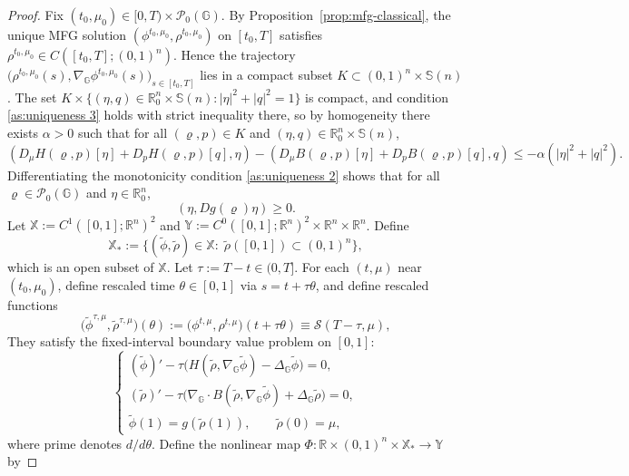 \documentclass[10pt]{article}
\numberwithin{equation}{section}
\newcommand{\cP}{ \mathcal{P}}
\newcommand{\cS}{ \mathcal{S}}
\newcommand{\bR}{\mathbb R}
\newcommand{\R}{\mathbb R}
\newcommand{\bS}{\mathbb S}
\def\R{{\mathbb{R}}}
\def\G{\mathbb{G}}
\begin{document}
\begin{proof}
Fix $(t_0,\mu_0) \in [0,T) \times \cP_0(\G)$. By Proposition~\ref{prop:mfg-classical}, the unique MFG solution $(\phi^{t_0,\mu_0}, \rho^{t_0,\mu_0})$ on $[t_0,T]$ satisfies $\rho^{t_0,\mu_0} \in C([t_0,T]; (0,1)^n)$. Hence the trajectory $\big(\rho^{t_0,\mu_0}(s), \nabla_\G \phi^{t_0,\mu_0}(s)\big)_{s \in [t_0,T]}$ lies in a compact subset $K \subset (0,1)^n \times \bS(n)$. The set $K \times \{(\eta, q) \in \bR^n_0 \times \bS(n) : |\eta|^2 + |q|^2 = 1\}$ is compact, and condition \eqref{as:uniqueness 3} holds with strict inequality there, so by homogeneity there exists $\alpha > 0$ such that for all $(\varrho, p) \in K$ and $(\eta, q) \in \bR^n_0 \times \bS(n)$, 
\begin{equation}\label{eq:strong monotonicity quant}
(D_\mu H(\varrho,p)[\eta] + D_p H(\varrho,p)[q], \eta) - (D_\mu B(\varrho,p)[\eta] + D_p B(\varrho,p)[q], q) \le -\alpha (|\eta|^2 + |q|^2).
\end{equation}
Differentiating the monotonicity condition \eqref{as:uniqueness 2} shows that for all $\varrho \in \cP_0(\G)$ and $\eta \in \R^n_0$,
\begin{equation}\label{eq:Dg monotonicity}
(\eta, Dg(\varrho)\eta) \ge 0.
\end{equation} 
Let $\mathbb X := C^1([0,1]; \R^n)^2$ and $\mathbb Y := C^0([0,1]; \R^n)^2 \times \R^n \times \R^n$. Define
\[
\mathbb X_* := \big\{(\tilde\phi, \tilde\rho) \in \mathbb X :\; \tilde\rho([0,1]) \subset (0,1)^n \big\},
\]
which is an open subset of $\mathbb X$. Let $\tau := T - t \in (0,T]$. For each $(t,\mu)$ near $(t_0,\mu_0)$, define rescaled time $\theta \in [0,1]$ via $s = t + \tau\theta$, and define rescaled functions
\[
\Big(\tilde\phi^{\tau,\mu}, \tilde\rho^{\tau,\mu}\Big)(\theta) := \big(\phi^{t,\mu},  \rho^{t,\mu}\big)(t + \tau\theta) \equiv \cS(T-\tau, \mu), 
\]
They satisfy the fixed-interval boundary value problem on $[0,1]$:
\begin{equation}\label{eq:rescaled-mfg-C1}
\begin{cases}
(\tilde\phi)' - \tau\big(H(\tilde\rho, \nabla_\G\tilde\phi) - \Delta_\G\tilde\phi\big) = 0, \\[1mm]
(\tilde\rho)' - \tau\big(\nabla_\G \cdot B(\tilde\rho, \nabla_\G\tilde\phi) + \Delta_\G\tilde\rho\big) = 0, \\[1mm]
\tilde\phi(1) = g(\tilde\rho(1)), \qquad \tilde\rho(0) = \mu,
\end{cases}
\end{equation}
where prime denotes $d/d\theta$.  Define the nonlinear map $\Phi : \bR \times (0,1)^n \times \mathbb X_* \to \mathbb Y$ by

\end{proof}
\end{document}

